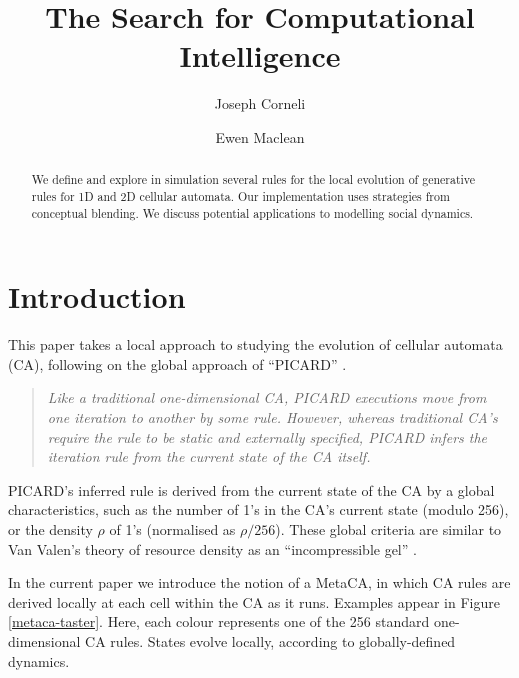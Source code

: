 \documentclass{AISB2008}
\newcommand*{\sourceatright}[1]{\unskip\hspace{1em plus 1fill}%
\nolinebreak[3]\hspace*{\fill}\mbox{#1}}%
\begin{document}
\title{The Search for Computational Intelligence}

\author{Joseph Corneli
\and
Ewen Maclean
}

\maketitle


\begin{abstract}
We define and explore in simulation several rules for the local
evolution of generative rules for 1D and 2D cellular automata.  Our
implementation uses strategies from conceptual blending.  We discuss
potential applications to modelling social dynamics.
\end{abstract}

\section{Introduction}

This paper takes a local approach to studying the evolution of
cellular automata (CA), following on the global approach of
``PICARD'' \cite{pavlic2014self}.

\begin{quote}
\emph{Like a traditional one-dimensional CA, PICARD executions move
  from one iteration to another by some rule. However, whereas
  traditional CA's require the rule to be static and externally
  specified, PICARD infers the iteration rule from the current state
  of the CA itself.}
\sourceatright{\cite[pp. 1--2]{pavlic2014self}}
\end{quote}

PICARD's inferred rule is derived from the current state of the CA by
a global characteristics, such as the number of 1's in the CA's
current state (modulo 256), or the density $\rho$ of 1's (normalised
as $\rho/256$).  These global criteria are similar to Van Valen's
theory of resource density as an ``incompressible gel'' \cite{van1973new}.

In the current paper we introduce the notion of a MetaCA, in which CA
rules are derived locally at each cell within the CA as it runs.
Examples appear in Figure \ref{metaca-taster}.  Here, each colour
represents one of the 256 standard one-dimensional CA rules.  States
evolve locally, according to globally-defined dynamics.
\end{document}

